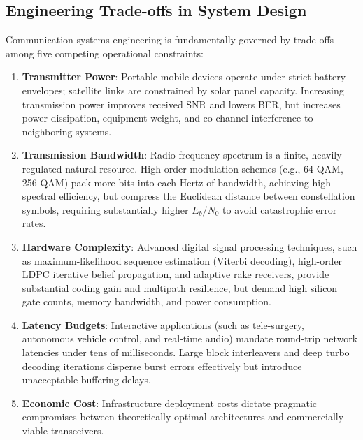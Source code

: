 \documentclass[10pt,twocolumn]{article}
\begin{document}
\subsection{Engineering Trade-offs in System Design}
Communication systems engineering is fundamentally governed by trade-offs among five competing operational constraints:
\begin{enumerate}
    \item \textbf{Transmitter Power}: Portable mobile devices operate under strict battery envelopes; satellite links are constrained by solar panel capacity. Increasing transmission power improves received SNR and lowers BER, but increases power dissipation, equipment weight, and co-channel interference to neighboring systems.
    \item \textbf{Transmission Bandwidth}: Radio frequency spectrum is a finite, heavily regulated natural resource. High-order modulation schemes (e.g., 64-QAM, 256-QAM) pack more bits into each Hertz of bandwidth, achieving high spectral efficiency, but compress the Euclidean distance between constellation symbols, requiring substantially higher $E_b/N_0$ to avoid catastrophic error rates.
    \item \textbf{Hardware Complexity}: Advanced digital signal processing techniques, such as maximum-likelihood sequence estimation (Viterbi decoding), high-order LDPC iterative belief propagation, and adaptive rake receivers, provide substantial coding gain and multipath resilience, but demand high silicon gate counts, memory bandwidth, and power consumption.
    \item \textbf{Latency Budgets}: Interactive applications (such as tele-surgery, autonomous vehicle control, and real-time audio) mandate round-trip network latencies under tens of milliseconds. Large block interleavers and deep turbo decoding iterations disperse burst errors effectively but introduce unacceptable buffering delays.
    \item \textbf{Economic Cost}: Infrastructure deployment costs dictate pragmatic compromises between theoretically optimal architectures and commercially viable transceivers.
\end{enumerate}
\end{document}
